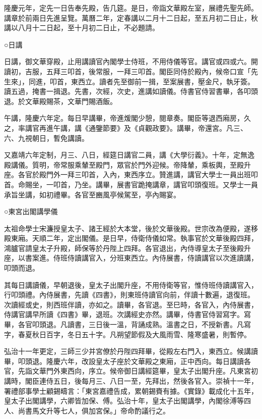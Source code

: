 隆慶元年，定先一日告奉先殿，告几筵。是日，帝詣文華殿左室，展禮先聖先師。講章於前兩日先進呈覽。萬曆二年，定春講以二月十二日起，至五月初二日止，秋講以八月十二日起，至十月初二日止，不必題請。

○日講

日講，御文華穿殿，止用講讀官內閣學士侍班，不用侍儀等官。講官或四或六。開讀初，吉服，五拜三叩首，後常服，一拜三叩首。閣臣同侍於殿內，候帝口宣「先生來」，同進，叩首，東西立。讀者先至御前一揖，至案展書，壓金尺，執牙簽。讀五過，掩書一揖退。先書，次經，次史，進講如讀儀。侍書官侍習書畢，各叩頭退。於文華殿賜茶，文華門賜酒飯。

午講，隆慶六年定。每日早講畢，帝進煖閣少憩，閱章奏。閣臣等退西廂房，久之，率講官再進午講，講《通鑒節要》及《貞觀政要》。講畢，帝還宮。凡三、六、九視朝日，暫免講讀。

又嘉靖六年定制，月三、八日，經筵日講官二員，講《大學衍義》。十年，定無逸殿講儀。質明，帝常服乘輦至殿門，眾官於門外迎候。帝降輦，乘板輿，至殿升座。各官於殿門外一拜三叩首，入內，東西序立。贊進講，講官大學士一員出班叩首。命賜坐，一叩首，乃坐。講畢，展書官跪掩講章，講官叩頭復班。又學士一員承旨坐講，如初禮畢。各官至豳風亭候駕至，亭內賜宴。

○東宮出閣講學儀

太祖命學士宋濂授皇太子、諸王經於大本堂，後於文華後殿。世宗改為便殿，遂移殿東廂。天順二年，定出閣儀。是日早，侍衛侍儀如常。執事官於文華後殿四拜，鴻臚官請皇太子升殿，師保等於丹陛上四拜。各官退出，內侍導皇太子至後殿升座，以書案進。侍班侍讀講官入，分班東西立。內侍展書，侍讀講官以次進讀講，叩頭而退。

其每日講讀儀，早朝退後，皇太子出閣升座，不用侍衛等官，惟侍班侍讀講官入，行叩頭禮。內侍展書，先讀《四書》，則東班侍讀官向前，伴讀十數遍，退復班。次讀經或史，則西班伴讀，亦如之。讀畢，各官退。至巳時，各官入，內侍展書，侍講官講早所讀《四書》畢，退班。次講經史亦然。講畢，侍書官侍習寫字。寫畢，各官叩頭退。凡讀書，三日後一溫，背誦成熟。溫書之日，不授新書。凡寫字，春夏秋日百字，冬日五十字。凡朔望節假及大風雨雪、隆寒盛暑，則暫停。

弘治十一年更定，三師三少并宮僚於丹陛四拜畢，從殿左右門入，東西立。候講讀畢，叩頭退。隆慶六年，改設皇太子座於文華殿之東廂，正中西向。每日講讀各官，先詣文華門外東西向，序立。候帝御日講經筵畢，皇太子出閣升座。凡東宮初講時，閣臣連侍五日，後每月三、八日一至，先拜出，然後各官入。崇禎十一年，署禮部事學士顧錫疇言：「東宮嘉禮告成，累朝錫賚有據。《實錄》載成化十五年，皇太子出閣講學，六卿皆加保、傅。弘治十年，皇太子出閣講學，內閣徐溥等四人、尚書馬文升等七人，俱加宮保。」帝命酌議行之。

